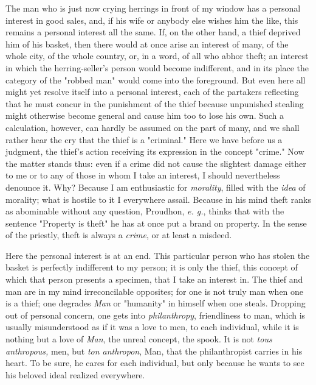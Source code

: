 The man who is just now crying herrings in front of my window has a personal 
interest in good sales, and, if his wife or anybody else wishes him the like, 
this remains a personal interest all the same. If, on the other hand, a thief 
deprived him of his basket, then there would at once arise an interest of 
many, of the whole city, of the whole country, or, in a word, of all who abhor 
theft; an interest in which the herring-seller's person would become 
indifferent, and in its place the category of the "{}robbed man"{} would come 
into the foreground. But even here all might yet resolve itself into a 
personal interest, each of the partakers reflecting that he must concur in the 
punishment of the thief because unpunished stealing might otherwise become 
general and cause him too to lose his own. Such a calculation, however, can 
hardly be assumed on the part of many, and we shall rather hear the cry that 
the thief is a "{}criminal."{} Here we have before us a judgment, the thief's 
action receiving its expression in the concept "{}crime."{} Now the matter 
stands thus: even if a crime did not cause the slightest damage either to me 
or to any of those in whom I take an interest, I should nevertheless denounce 
it. Why? Because I am enthusiastic for \textit{morality}, filled with the 
\textit{idea} of morality; what is hostile to it I everywhere assail. Because 
in his mind theft ranks as abominable without any question, Proudhon, 
\textit{e. g.}, thinks that with the sentence "{}Property is theft"{} he has 
at once put a brand on property. In the sense of the priestly, theft is always 
a \textit{crime}, or at least a misdeed.

Here the personal interest is at an end. This particular person who has stolen 
the basket is perfectly indifferent to my person; it is only the thief, this 
concept of which that person presents a specimen, that I take an interest in. 
The thief and man are in my mind irreconcilable opposites; for one is not 
truly man when one is a thief; one degrades \textit{Man} or "{}humanity"{} in 
himself when one steals. Dropping out of personal concern, one gets into 
\textit{philanthropy}, friendliness to man, which is usually misunderstood as 
if it was a love to men, to each individual, while it is nothing but a love of 
\textit{Man}, the unreal concept, the spook. It is not \textit{tous 
anthropous,} men, but \textit{ton anthropon}, Man, that the philanthropist 
carries in his heart. To be sure, he cares for each individual, but only 
because he wants to see his beloved ideal realized everywhere.

